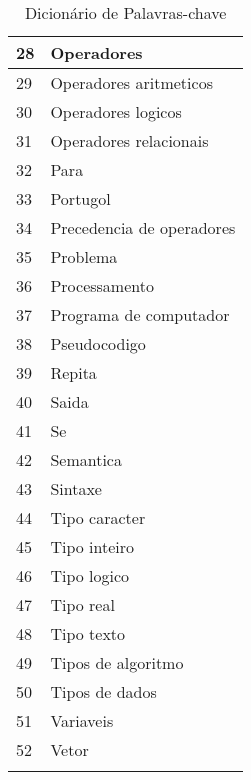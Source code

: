 \begin{longtable}{| p{} | p{} |}
28 & Operadores                \\ \hline
29 & Operadores aritmeticos    \\ \hline
30 & Operadores logicos        \\ \hline
31 & Operadores relacionais    \\ \hline
32 & Para                      \\ \hline
33 & Portugol                  \\ \hline
34 & Precedencia de operadores \\ \hline
35 & Problema                  \\ \hline
36 & Processamento             \\ \hline
37 & Programa de computador    \\ \hline
38 & Pseudocodigo              \\ \hline
39 & Repita                    \\ \hline
40 & Saida                     \\ \hline
41 & Se                        \\ \hline
42 & Semantica                 \\ \hline
43 & Sintaxe                   \\ \hline
44 & Tipo caracter             \\ \hline
45 & Tipo inteiro              \\ \hline
46 & Tipo logico               \\ \hline
47 & Tipo real                 \\ \hline
48 & Tipo texto                \\ \hline
49 & Tipos de algoritmo        \\ \hline
50 & Tipos de dados            \\ \hline
51 & Variaveis                 \\ \hline
52 & Vetor                     \\ \hline
\caption{Dicionário de Palavras-chave}
\label{tab:dicionario-palavras-chave}
\end{longtable}